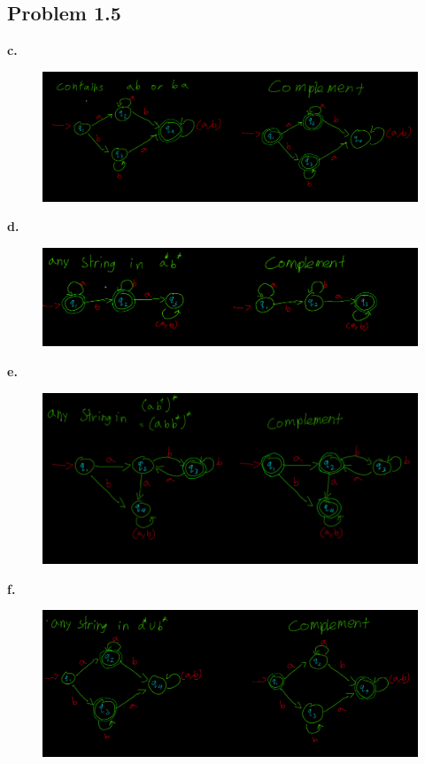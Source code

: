 \documentclass[letter]{article}
\theoremstyle{case}
\begin{document}
\subsection*{Problem 1.5}
\textbf{c.}
\begin{figure}[h!]
	\includegraphics[scale=0.4]{5c.png}
\end{figure}

\textbf{d.}
\begin{figure}[h!]
	\includegraphics[scale=0.4]{5d.png}
\end{figure}

\textbf{e.}
\begin{figure}[h!]
	\includegraphics[scale=0.4]{5e.png}
\end{figure}

\newpage

\textbf{f.}
\begin{figure}[h!]
	\includegraphics[scale=0.4]{5f.png}
\end{figure}
\end{document}
